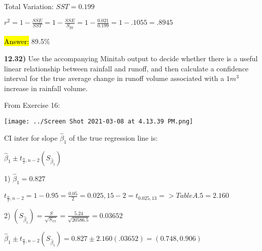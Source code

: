 \documentclass{article}
\begin{document}
\vspace{2mm} 


    
Total Variation: $SST=0.199$


    
\vspace{2mm}  
    
$r^{2}=1-\frac{SSE}{SST}=1-\frac{SSE}{S_{yy}}=1-\frac{0.021}{0.199}=1-.1055=.8945$

\vspace{2mm}

\hl{Answer:} 89.5\%




\newpage
\textbf{12.32)} Use the accompanying Minitab output to decide whether there is a useful linear relationship between rainfall and runoff, and then calculate a confidence interval for the true average change in runoff volume associated with a $1 m^{3}$ increase in rainfall volume.

\vspace{2mm}

From Exercise 16:

\vspace{2mm}

\texttt{[image: ../Screen Shot 2021-03-08 at 4.13.39 PM.png]}

\vspace{2mm}


CI inter for slope $\hat{\beta}_{1}$ of the true regression line is:

\vspace{2mm}

$\hat{\beta}_{1} \pm t_{\frac{\alpha}{2}, n-2}(S_{\hat{\beta}_{1}})$


\vspace{2mm}

1) $\hat{\beta}_{1}=0.827$

\vspace{2mm}

 $t_{\frac{\alpha}{2}, n-2}=1-0.95=\frac{0.05}{2}=0.025, 15-2=t_{0.025, 13}=> Table A.5=2.160$
 
 \vspace{2mm}


2) $(S_{\hat{\beta}_{1}})=\frac{S}{\sqrt{S_{xx}}}=\frac{5.24}{\sqrt{20586.5}}=0.03652$

 \vspace{2mm}



$\hat{\beta}_{1} \pm t_{\frac{\alpha}{2}, n-2}(S_{\hat{\beta}_{1}})=0.827 \pm 2.160(.03652)=(0.748,0.906)$
\end{document}
